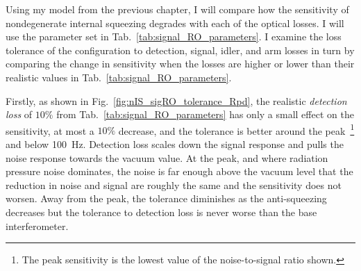 Using my model from the previous chapter, I will compare how the sensitivity of nondegenerate internal squeezing degrades with each of the optical losses. I will use the parameter set in Tab.~\ref{tab:signal_RO_parameters}.
I examine the loss tolerance of the configuration to detection, signal, idler, and arm losses in turn by comparing the change in sensitivity when the losses are higher or lower than their realistic values in Tab.~\ref{tab:signal_RO_parameters}. %

Firstly, as shown in Fig.~\ref{fig:nIS_sigRO_tolerance_Rpd}, the realistic \emph{detection loss} of $10\%$ from Tab.~\ref{tab:signal_RO_parameters} has only a small effect on the sensitivity, at most a $10\%$ decrease, and the tolerance is better around the peak~\footnote{The peak sensitivity is the lowest value of the noise-to-signal ratio shown.} and below 100~Hz.
Detection loss scales down the signal response and pulls the noise response towards the vacuum value. At the peak, and where radiation pressure noise dominates, the noise is far enough above the vacuum level that the reduction in noise and signal are roughly the same and the sensitivity does not worsen. Away from the peak, the tolerance diminishes as the anti-squeezing decreases but the tolerance to detection loss is never worse than the base interferometer. %

